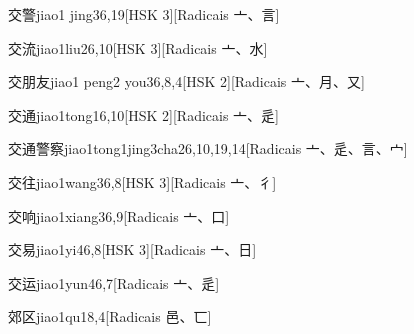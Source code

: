 \begin{entry}{交警}{jiao1 jing3}{6,19}[HSK 3][Radicais ⼇、⾔]
\end{entry}

\begin{entry}{交流}{jiao1liu2}{6,10}[HSK 3][Radicais ⼇、⽔]
\end{entry}

\begin{entry}{交朋友}{jiao1 peng2 you3}{6,8,4}[HSK 2][Radicais ⼇、⽉、⼜]
\end{entry}

\begin{entry}{交通}{jiao1tong1}{6,10}[HSK 2][Radicais ⼇、⾡]
\end{entry}

\begin{entry}{交通警察}{jiao1tong1jing3cha2}{6,10,19,14}[Radicais ⼇、⾡、⾔、⼧]
\end{entry}

\begin{entry}{交往}{jiao1wang3}{6,8}[HSK 3][Radicais ⼇、⼻]
\end{entry}

\begin{entry}{交响}{jiao1xiang3}{6,9}[Radicais ⼇、⼝]
\end{entry}

\begin{entry}{交易}{jiao1yi4}{6,8}[HSK 3][Radicais ⼇、⽇]
\end{entry}

\begin{entry}{交运}{jiao1yun4}{6,7}[Radicais ⼇、⾡]
\end{entry}

\begin{entry}{郊区}{jiao1qu1}{8,4}[Radicais ⾢、⼖]
\end{entry}

